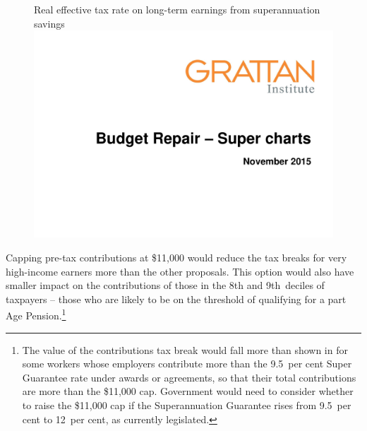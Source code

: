 \documentclass{grattanAlpha}
\begin{document}
\begin{figure}
%
{Real effective tax rate on long-term earnings from superannuation savings}\label{fig:SUPER-4-9}
\includegraphics[width=\columnwidth,page=27]{super-atlas/PPTX.pdf}
\end{figure}

Capping pre-tax contributions at \$11,000 would reduce the tax breaks for very high-income earners more than the other proposals. This option would also have smaller impact on the contributions of those in the 8th and 9th~deciles of taxpayers – those who are likely to be on the threshold of qualifying for a part Age Pension.\footnote{The value of the contributions tax break would fall more than shown in  for some workers whose employers contribute more than the 9.5~per cent Super Guarantee rate under awards or agreements, so that their total contributions are more than the \$11,000 cap. Government would need to consider whether to raise the \$11,000 cap if the Superannuation Guarantee rises from 9.5~per cent to 12~per cent, as currently legislated.} 
\end{document}
